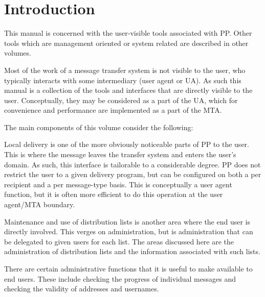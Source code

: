 
\chapter{Introduction}

This manual is concerned with the user-visible tools associated with
PP. Other tools which are management oriented or system related are
described in other volumes.

Most of the work of a message transfer system is not visible to the
user, who typically interacts with some intermediary (user agent or
UA). As such this manual is a collection of the tools and interfaces
that are directly visible to the user.  Conceptually, they may be
considered as a part of the UA, which for convenience and performance
are implemented as a part of the MTA.

The main components of this volume consider the following:

\begin{describe}
\item[\verb|local delivery|:]	Local delivery is one of the more
obviously noticeable parts of PP to the user. This is where the
message leaves the transfer system and enters the user's domain. As
such, this interface is tailorable to a considerable degree. PP does
not restrict the user to a given delivery program, but can be
configured on both a per recipient and a per message-type basis. This
is conceptually a user agent function, but it is often more efficient
to do this operation at the user agent/MTA boundary.

\item[\verb|distribution lists|:]	Maintenance and use of
distribution lists is another area where the end user is directly
involved. This verges on administration, but is administration that
can be delegated to given users for each list. The areas discussed
here are the administration of distribution lists and the information
associated with such lists.

\item[\verb|user oriented management|:]	There are certain
administrative functions that it is useful to make available to end
users. These include checking the progress of individual messages and
checking the validity of addresses and usernames.

\end{describe}

